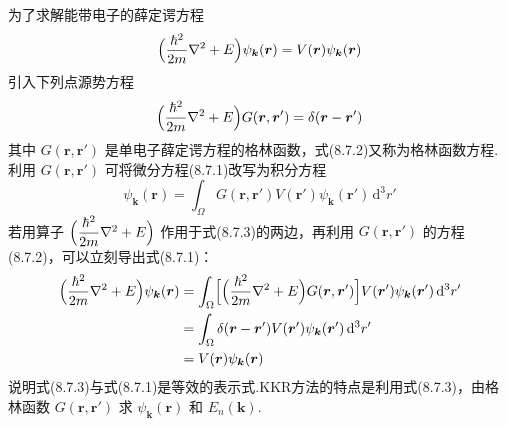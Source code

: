 为了求解能带电子的薛定谔方程
\begin{equation}
  \Bigl(\frac{\hbar^{2}}{2m}\nabla^{2}+E\Bigr)\psi_{\boldsymbol{k}}(\boldsymbol{r})=V(\boldsymbol{r})\psi_{\boldsymbol{k}}(\boldsymbol{r})
\end{equation}
引入下列点源势方程
\begin{equation}
  \Bigl(\frac{\hbar^{2}}{2m}\nabla^{2}+E\Bigr)G(\boldsymbol{r},\boldsymbol{r}')=\delta(\boldsymbol{r}-\boldsymbol{r}')
\end{equation}
其中 $G(\boldsymbol{r},\boldsymbol{r}')$ 是单电子薛定谔方程的格林函数，式(8.7.2)又称为格林函数方程.利用 $G(\boldsymbol{r},\boldsymbol{r}')$ 可将微分方程(8.7.1)改写为积分方程
\begin{equation}
  \psi_{\boldsymbol{k}}(\boldsymbol{r})=\int_{\Omega}G(\boldsymbol{r},\boldsymbol{r}')V(\boldsymbol{r}')\psi_{\boldsymbol{k}}(\boldsymbol{r}')\,\mathrm{d}^{3}r'
\end{equation}
若用算子 $\Bigl(\dfrac{\hbar^{2}}{2m}\nabla^{2}+E\Bigr)$ 作用于式(8.7.3)的两边，再利用 $G(\boldsymbol{r},\boldsymbol{r}')$ 的方程(8.7.2)，可以立刻导出式(8.7.1)：
\begin{equation*}
\begin{aligned}
  \Bigl(\frac{\hbar^{2}}{2m}\nabla^{2}+E\Bigr)\psi_{\boldsymbol{k}}(\boldsymbol{r})
  &=\int_{\Omega}\Bigl[\Bigl(\frac{\hbar^{2}}{2m}\nabla^{2}+E\Bigr)G(\boldsymbol{r},\boldsymbol{r}')\Bigr]V(\boldsymbol{r}')\psi_{\boldsymbol{k}}(\boldsymbol{r}')\,\mathrm{d}^{3}r'\\
  &=\int_{\Omega}\delta(\boldsymbol{r}-\boldsymbol{r}')V(\boldsymbol{r}')\psi_{\boldsymbol{k}}(\boldsymbol{r}')\,\mathrm{d}^{3}r'\\
  &=V(\boldsymbol{r})\psi_{\boldsymbol{k}}(\boldsymbol{r})
\end{aligned}
\end{equation*}
说明式(8.7.3)与式(8.7.1)是等效的表示式.KKR方法的特点是利用式(8.7.3)，由格林函数 $G(\boldsymbol{r},\boldsymbol{r}')$ 求 $\psi_{\boldsymbol{k}}(\boldsymbol{r})$ 和 $E_{n}(\boldsymbol{k})$.

